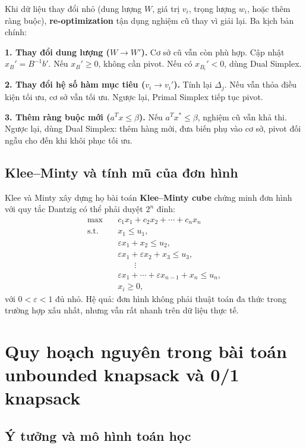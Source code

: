 Khi dữ liệu thay đổi nhỏ (dung lượng $W$, giá trị $v_i$, trọng lượng $w_i$, hoặc thêm ràng buộc), \textbf{re-optimization} tận dụng nghiệm cũ thay vì giải lại. Ba kịch bản chính:

\textbf{1. Thay đổi dung lượng ($W \to W'$).} Cơ sở cũ vẫn còn phù hợp. Cập nhật $x_B' = B^{-1}b'$. Nếu $x_B'\ge 0$, không cần pivot. Nếu có $x_{B_i}'<0$, dùng Dual Simplex.

\textbf{2. Thay đổi hệ số hàm mục tiêu ($v_i \to v_i'$).} Tính lại $\Delta_j$. Nếu vẫn thỏa điều kiện tối ưu, cơ sở vẫn tối ưu. Ngược lại, Primal Simplex tiếp tục pivot.

\textbf{3. Thêm ràng buộc mới ($a^Tx\le\beta$).} Nếu $a^Tx^*\le\beta$, nghiệm cũ vẫn khả thi. Ngược lại, dùng Dual Simplex: thêm hàng mới, đưa biến phụ vào cơ sở, pivot đối ngẫu cho đến khi khôi phục tối ưu.

\subsection{Klee--Minty và tính mũ của đơn hình}

Klee và Minty xây dựng họ bài toán \textbf{Klee--Minty cube} chứng minh đơn hình với quy tắc Dantzig có thể phải duyệt $2^n$ đỉnh:
\[
\begin{aligned}
\max \quad & c_1x_1+c_2x_2+\cdots+c_nx_n \\
\text{s.t.}\quad
& x_1 \le u_1, \\
& \varepsilon x_1 + x_2 \le u_2, \\
& \varepsilon x_1 + \varepsilon x_2 + x_3 \le u_3, \\
& \qquad \vdots \\
& \varepsilon x_1+\cdots+\varepsilon x_{n-1}+x_n \le u_n, \\
& x_i \ge 0,
\end{aligned}
\]
với $0<\varepsilon<1$ đủ nhỏ. Hệ quả: đơn hình không phải thuật toán đa thức trong trường hợp xấu nhất, nhưng vẫn rất nhanh trên dữ liệu thực tế.


\section{Quy hoạch nguyên trong bài toán unbounded knapsack và 0/1 knapsack}

\subsection{Ý tưởng và mô hình toán học}

